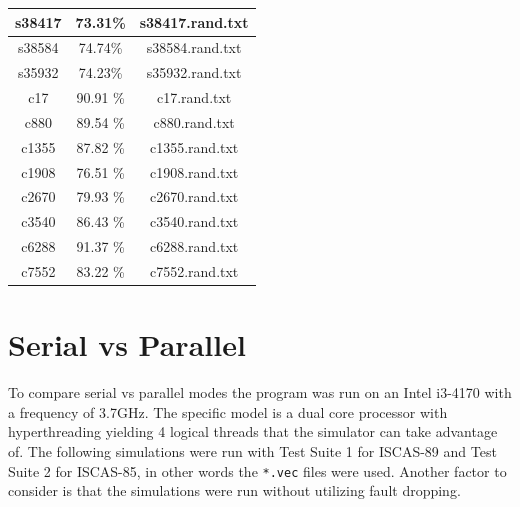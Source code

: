 \documentclass[a4paper,12pt]{article}
\begin{document}
\begin{center}
\begin{tabular}{||c c c||}
\hline
s38417 & 73.31\% & s38417.rand.txt \\
\hline
s38584 & 74.74\% & s38584.rand.txt \\
\hline
s35932 & 74.23\% & s35932.rand.txt \\
\hline
c17 & 90.91 \%  & c17.rand.txt \\ 
\hline
c880 & 89.54 \%  & c880.rand.txt \\ 
\hline
c1355 & 87.82 \%  & c1355.rand.txt \\ 
\hline
c1908 & 76.51 \%  & c1908.rand.txt \\ 
\hline
c2670 & 79.93 \%  & c2670.rand.txt \\ 
\hline
c3540 & 86.43 \%  & c3540.rand.txt \\ 
\hline
c6288 & 91.37 \%  & c6288.rand.txt \\ 
\hline
c7552 & 83.22 \%  & c7552.rand.txt \\ 
\hline
\end{tabular}
\end{center}



\clearpage

\section*{Serial vs Parallel}
To compare serial vs parallel modes the program was run on an Intel i3-4170 with a frequency of 3.7GHz. The specific model is a dual core processor with hyperthreading yielding 4 logical threads that the simulator can take advantage of. The following simulations were run with Test Suite 1 for ISCAS-89 and Test Suite 2 for ISCAS-85, in other words the \texttt{*.vec} files were used. Another factor to consider is that the simulations were run without utilizing fault dropping.
\end{document}
